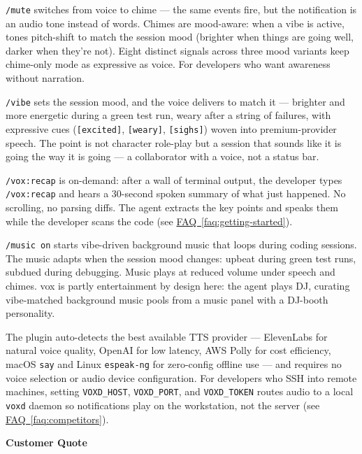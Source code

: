 \documentclass[11pt,letterpaper]{article}
\newcommand{\prsection}[1]{%
  \vspace{1em}%
  {\large\bfseries\color{SectionBlue}#1}%
  \vspace{0.3em}\par%
}
\newcommand{\faqref}[1]{\hyperref[#1]{FAQ~\ref*{#1}}}
\begin{document}
\texttt{/mute} switches from voice to chime --- the same events fire, but
the notification is an audio tone instead of words. Chimes are mood-aware:
when a vibe is active, tones pitch-shift to match the session mood (brighter
when things are going well, darker when they're not). Eight distinct signals
across three mood variants keep chime-only mode as expressive as voice. For
developers who want awareness without narration.

\texttt{/vibe} sets the session mood, and the voice delivers to match it ---
brighter and more energetic during a green test run, weary after a string of
failures, with expressive cues (\texttt{[excited]}, \texttt{[weary]},
\texttt{[sighs]}) woven into premium-provider speech. The point is not
character role-play but a session that sounds like it is going the way it is
going --- a collaborator with a voice, not a status bar.

\texttt{/vox:recap} is on-demand: after a wall of terminal output, the developer
types \texttt{/vox:recap} and hears a 30-second spoken summary of what just
happened. No scrolling, no parsing diffs. The agent extracts the key points
and speaks them while the developer scans the code
(see \faqref{faq:getting-started}).

\texttt{/music on} starts vibe-driven background music that loops during coding
sessions. The music adapts when the session mood changes: upbeat during green
test runs, subdued during debugging. Music plays at reduced volume under speech
and chimes. vox is partly entertainment by design here: the agent plays
DJ, curating vibe-matched background music pools from a music panel with a
DJ-booth personality.

The plugin auto-detects the best available TTS provider --- ElevenLabs for
natural voice quality, OpenAI for low latency, AWS Polly for cost efficiency,
macOS \texttt{say} and Linux \texttt{espeak-ng} for zero-config offline use
--- and requires no voice selection or audio device configuration. For
developers who SSH into remote machines, setting \texttt{VOXD\_HOST},
\texttt{VOXD\_PORT}, and \texttt{VOXD\_TOKEN} routes audio to a local
\texttt{voxd} daemon so
notifications play on the workstation, not the server
(see \faqref{faq:competitors}).

\prsection{Customer Quote}
\end{document}
